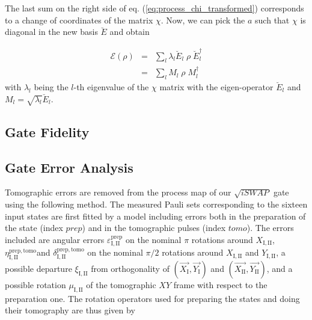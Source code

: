 The last sum on the right side of eq. (\ref{eq:process_chi_transformed}) corresponds to a change of coordinates of the matrix $\chi$. Now, we can pick the $a$ such that $\chi$ is diagonal in the new basis $\breve{E}$ and obtain

\begin{eqnarray}
 \mathcal{E}(\rho) & = &  \sum\limits_{l} \lambda_l \breve{E}_l \; \rho \; \breve{E}_l^\dagger \\
& = &  \sum\limits_{l} M_l \; \rho \; M_l^\dagger
\end{eqnarray}
with $\lambda_l$ being the $l$-th eigenvalue of the $\chi$ matrix with the eigen-operator $\breve{E}_l$ and $M_{l} = \sqrt{\lambda_l} \breve{E}_l$.

\subsection{Gate Fidelity}

\subsection{Gate Error Analysis}

Tomographic errors are removed from the process map of our $\sqrt{iSWAP}$
gate using the following method. The measured Pauli sets corresponding
to the sixteen input states are first fitted by a model including
errors both in the preparation of the state (index $prep$) and in
the tomographic pulses (index $tomo$). The errors included are angular
errors $\varepsilon_{\mathrm{I,II}}^{\mathrm{prep}}$ on the nominal
$\pi$ rotations around $X_{\mathrm{I,II}}$, $\eta_{\mathrm{I,II}}^{\mathrm{prep,tomo}}$and
$\delta_{\mathrm{I,II}}^{\mathrm{prep,tomo}}$ on the nominal $\pi/2$
rotations around $X_{\mathrm{I,II}}$ and $Y_{\mathrm{I,II}}$, a
possible departure $\xi_{\mathrm{I,II}}$ from orthogonality of $\left(\overrightarrow{X_{\mathrm{I}}},\overrightarrow{Y_{\mathrm{I}}}\right)$
and $\left(\overrightarrow{X_{\mathrm{II}}},\overrightarrow{Y_{\mathrm{II}}}\right)$,
and a possible rotation $\mu_{\mathrm{I,II}}$ of the tomographic
$XY$ frame with respect to the preparation one. The rotation operators
used for preparing the states and doing their tomography are thus
given by

